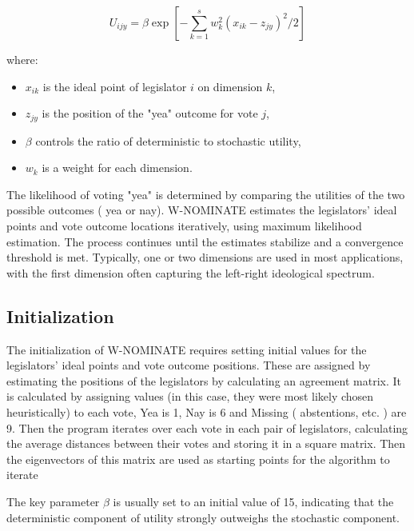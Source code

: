 \documentclass{report}
\begin{document}
                \[
                    U_{ijy} = \beta \exp \left[ -\sum_{k=1}^{s} w_k^2 (x_{ik} - z_{jy})^2 / 2 \right]
                \]

                where:
                \begin{itemize}
                    \item \( x_{ik} \) is the ideal point of legislator \(i\) on dimension \(k\),
                    \item \( z_{jy} \) is the position of the "yea" outcome for vote \(j\),
                    \item \( \beta \) controls the ratio of deterministic to stochastic utility,
                    \item \( w_k \) is a weight for each dimension.
                \end{itemize}

                The likelihood of voting "yea" is determined by comparing the utilities of the two possible outcomes (
                yea or nay). W-NOMINATE estimates the legislators' ideal points and vote outcome locations iteratively,
                using maximum likelihood estimation. The process continues until the estimates stabilize and a
                convergence threshold is met. Typically, one or two dimensions are used in most applications, with the
                first dimension often capturing the left-right ideological spectrum.

            \subsection{Initialization}
                The initialization of W-NOMINATE requires setting initial values for the legislators' ideal points and
                vote outcome positions. These are assigned by estimating the positions of
                the legislators by calculating an agreement matrix. It is calculated by assigning values (in this
                case, they were most likely chosen heuristically) to each vote, Yea is 1, Nay is 6 and Missing (
                abstentions, etc. ) are 9. Then the program iterates over each vote in each pair of legislators,
                calculating the average distances between their votes and storing it in a square matrix. Then the
                eigenvectors of this matrix are used as starting points for the algorithm to iterate


                The key parameter \( \beta \) is usually set to an initial value of 15, indicating that the
                deterministic component of utility
                strongly outweighs the stochastic component.
\end{document}
